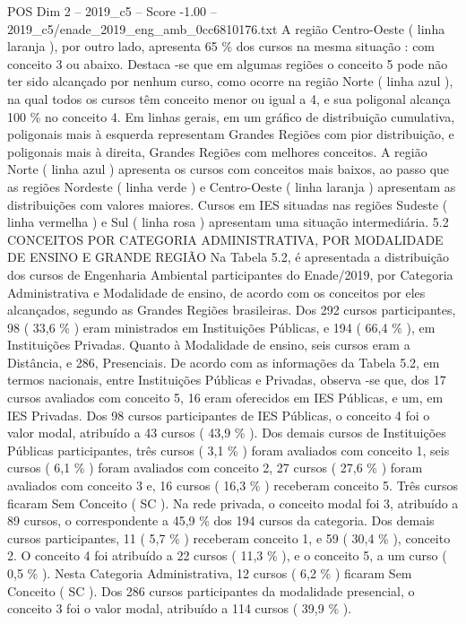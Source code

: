 \begin{textsample}{POS Dim 2 – 2019\_c5 – Score -1.00 – 2019\_c5/enade\_2019\_eng\_amb\_0cc6810176.txt}
A região Centro-Oeste ( linha laranja ), por outro lado, apresenta 65 \% dos cursos na mesma situação : com conceito 3 ou abaixo.
Destaca -se que em algumas regiões o conceito 5 pode não ter sido alcançado por nenhum curso, como ocorre na região Norte ( linha azul ), na qual todos os cursos têm conceito menor ou igual a 4, e sua poligonal alcança 100 \% no conceito 4.
Em linhas gerais, em um gráfico de distribuição cumulativa, poligonais mais à esquerda representam Grandes Regiões com pior distribuição, e poligonais mais à direita, Grandes Regiões com melhores conceitos.
A região Norte ( linha azul ) apresenta os cursos com conceitos mais baixos, ao passo que as regiões Nordeste ( linha verde ) e Centro-Oeste ( linha laranja ) apresentam as distribuições com valores maiores.
Cursos em IES situadas nas regiões Sudeste ( linha vermelha ) e Sul ( linha rosa ) apresentam uma situação intermediária. 5.2 CONCEITOS POR CATEGORIA ADMINISTRATIVA, POR MODALIDADE DE ENSINO E GRANDE REGIÃO Na Tabela 5.2, é apresentada a distribuição dos cursos de Engenharia Ambiental participantes do Enade/2019, por Categoria Administrativa e Modalidade de ensino, de acordo com os conceitos por eles alcançados, segundo as Grandes Regiões brasileiras.
Dos 292 cursos participantes, 98 ( 33,6 \% ) eram ministrados em Instituições Públicas, e 194 ( 66,4 \% ), em Instituições Privadas.
Quanto à Modalidade de ensino, seis cursos eram a Distância, e 286, Presenciais.
De acordo com as informações da Tabela 5.2, em termos nacionais, entre Instituições Públicas e Privadas, observa -se que, dos 17 cursos avaliados com conceito 5, 16 eram oferecidos em IES Públicas, e um, em IES Privadas.
Dos 98 cursos participantes de IES Públicas, o conceito 4 foi o valor modal, atribuído a 43 cursos ( 43,9 \% ).
Dos demais cursos de Instituições Públicas participantes, três cursos ( 3,1 \% ) foram avaliados com conceito 1, seis cursos ( 6,1 \% ) foram avaliados com conceito 2, 27 cursos ( 27,6 \% ) foram avaliados com conceito 3 e, 16 cursos ( 16,3 \% ) receberam conceito 5.
Três cursos ficaram Sem Conceito ( SC ).
Na rede privada, o conceito modal foi 3, atribuído a 89 cursos, o correspondente a 45,9 \% dos 194 cursos da categoria.
Dos demais cursos participantes, 11 ( 5,7 \% ) receberam conceito 1, e 59 ( 30,4 \% ), conceito 2.
O conceito 4 foi atribuído a 22 cursos ( 11,3 \% ), e o conceito 5, a um curso ( 0,5 \% ).
Nesta Categoria Administrativa, 12 cursos ( 6,2 \% ) ficaram Sem Conceito ( SC ).
Dos 286 cursos participantes da modalidade presencial, o conceito 3 foi o valor modal, atribuído a 114 cursos ( 39,9 \% ).

\end{textsample}
